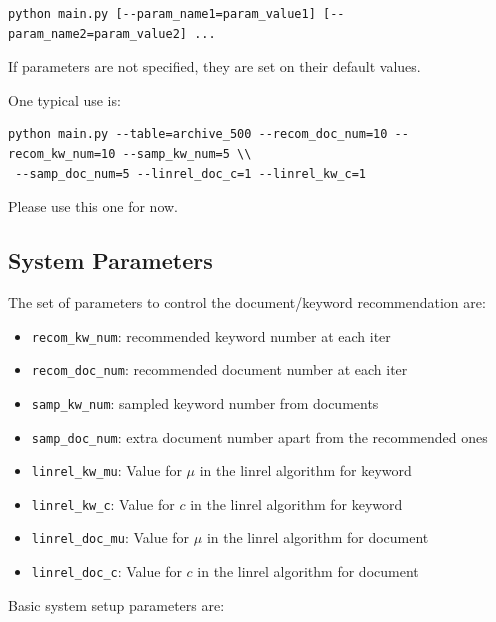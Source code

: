 \documentclass[10pt,a4paper]{article}
\begin{document}
\begin{verbatim}
python main.py [--param_name1=param_value1] [--param_name2=param_value2] ...
\end{verbatim}

If parameters are not specified, they are set on their default values.

One typical use is:

\begin{verbatim}
python main.py --table=archive_500 --recom_doc_num=10 --recom_kw_num=10 --samp_kw_num=5 \\
 --samp_doc_num=5 --linrel_doc_c=1 --linrel_kw_c=1
\end{verbatim}

Please use this one for now.

\subsection{System Parameters}

The set of parameters to control the document/keyword recommendation are:

\begin{itemize}
\item \verb+recom_kw_num+:  recommended keyword number at each iter
\item \verb+recom_doc_num+:  recommended document number at each iter
\item \verb+samp_kw_num+:  sampled keyword number from documents
\item \verb+samp_doc_num+:  extra document number apart from the recommended ones
\item \verb+linrel_kw_mu+:  Value for $\mu$ in the linrel algorithm for keyword
\item \verb+linrel_kw_c+:  Value for $c$ in the linrel algorithm for keyword
\item \verb+linrel_doc_mu+: Value for $\mu$ in the linrel algorithm for document
\item \verb+linrel_doc_c+:  Value for $c$ in the linrel algorithm for document
\end{itemize}

Basic system setup parameters are:
\end{document}
